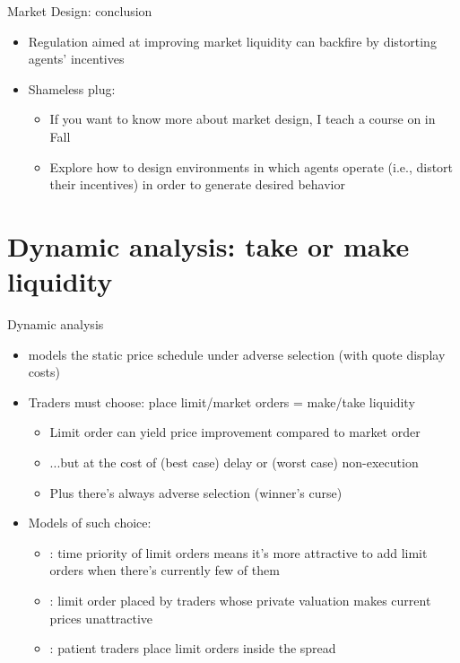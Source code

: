 \documentclass[english,10pt
,aspectratio=169
]{beamer}
\begin{document}
\begin{frame}{Market Design: conclusion}
	\begin{itemize}
		\item Regulation aimed at improving market liquidity can backfire by distorting agents' incentives
		\item Shameless plug:
		\begin{itemize}
			\item If you want to know more about market design, I teach a course on  in Fall
			\item Explore how to design environments in which agents operate (i.e., distort their incentives) in order to generate desired behavior
		\end{itemize}
	\end{itemize}
\end{frame}



\section{Dynamic analysis: take or make liquidity}

\begin{frame}{Dynamic analysis}
	\begin{itemize}
		\item \cite{glosten_is_1994} models the static price schedule under adverse selection (with quote display costs)
		\item Traders must choose: place limit/market orders = make/take liquidity
		\begin{itemize}
			\item Limit order can yield price improvement compared to market order
			\item ...but at the cost of (best case) delay or (worst case) non-execution
			\item Plus there's always adverse selection (winner's curse)
		\end{itemize}
		\item Models of such choice:
		\begin{itemize}
			\item \cite{parlour_price_1998}: time priority of limit orders means it's more attractive to add limit orders when there's currently few of them
			\item \cite{foucault_order_1999}: limit order placed by traders whose private valuation makes current prices unattractive
			\item \citet*{foucault_limit_2005}: patient traders place limit orders inside the spread
		\end{itemize}
	\end{itemize}
\end{frame}
\end{document}
